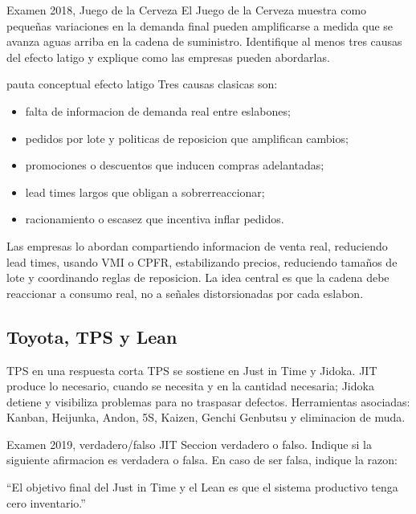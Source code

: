 \begin{enunciado}{Examen 2018, Juego de la Cerveza}
El Juego de la Cerveza muestra como pequeñas variaciones en la demanda final pueden amplificarse a medida que se avanza aguas arriba en la cadena de suministro. Identifique al menos tres causas del efecto latigo y explique como las empresas pueden abordarlas.
\end{enunciado}

\begin{pautacompleta}{pauta conceptual efecto latigo}
Tres causas clasicas son:
\begin{itemize}
  \item falta de informacion de demanda real entre eslabones;
  \item pedidos por lote y politicas de reposicion que amplifican cambios;
  \item promociones o descuentos que inducen compras adelantadas;
  \item lead times largos que obligan a sobrerreaccionar;
  \item racionamiento o escasez que incentiva inflar pedidos.
\end{itemize}
Las empresas lo abordan compartiendo informacion de venta real, reduciendo lead times, usando VMI o CPFR, estabilizando precios, reduciendo tamaños de lote y coordinando reglas de reposicion. La idea central es que la cadena debe reaccionar a consumo real, no a señales distorsionadas por cada eslabon.
\end{pautacompleta}

\subsection{Toyota, TPS y Lean}

\begin{materia}{TPS en una respuesta corta}
TPS se sostiene en Just in Time y Jidoka. JIT produce lo necesario, cuando se necesita y en la cantidad necesaria; Jidoka detiene y visibiliza problemas para no traspasar defectos. Herramientas asociadas: Kanban, Heijunka, Andon, 5S, Kaizen, Genchi Genbutsu y eliminacion de muda.
\end{materia}

\begin{enunciado}{Examen 2019, verdadero/falso JIT}
Seccion verdadero o falso. Indique si la siguiente afirmacion es verdadera o falsa. En caso de ser falsa, indique la razon:

``El objetivo final del Just in Time y el Lean es que el sistema productivo tenga cero inventario.''
\end{enunciado}

